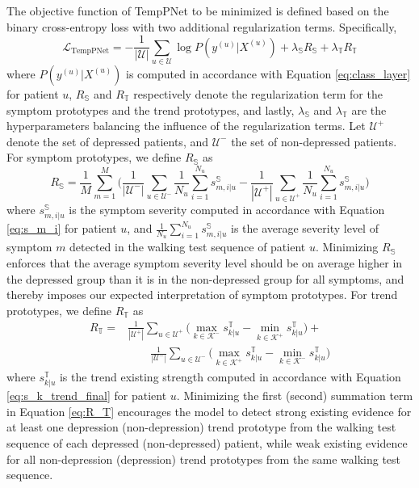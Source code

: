 \documentclass[mnsc]{informs3b} %
\begin{document}
The objective function of TempPNet to be minimized is defined based on the binary cross-entropy loss with two additional regularization terms. Specifically, 
\begin{equation}
  \label{eq:objective}
   \mathcal{L}_{\text{TempPNet}} = - \frac{1}{|\mathcal{U}|} \sum_{u \in \mathcal{U} } \log P(y^{(u)}|X^{(u)}) + \lambda_{\mathbb{S}} R_{\mathbb{S}} + \lambda_{\mathbb{T}} R_{\mathbb{T}}
\end{equation}
where $P(y^{(u)}|X^{(u)})$ is computed in accordance with Equation \ref{eq:class_layer} for patient $u$, $R_{\mathbb{S}}$ and $R_{\mathbb{T}}$ respectively denote the regularization term for the symptom prototypes and the trend prototypes, and lastly, $\lambda_{\mathbb{S}}$ and $\lambda_{\mathbb{T}}$ are the hyperparameters balancing the influence of the regularization terms. 
Let $\mathcal{U}^{+}$ denote the set of depressed patients, and $\mathcal{U}^{-}$ the set of non-depressed patients.
For symptom prototypes, we define $R_{\mathbb{S}}$ as
\begin{equation}
    \label{eq:R_S}
    R_{\mathbb{S}} = \frac{1}{M} \sum_{m=1}^{M} \Big( \frac{1}{|\mathcal{U}^{-}|} \sum_{u \in \mathcal{U}^{-}} 
       \frac{1}{N_u} \sum_{i=1}^{N_u} s_{m,i|u}^{\mathbb{S}}
       - 
       \frac{1}{|\mathcal{U}^{+}|} \sum_{u \in \mathcal{U}^{+}} 
       \frac{1}{N_u} \sum_{i=1}^{N_u} s_{m,i|u}^{\mathbb{S}} \Big)
\end{equation}
where $s_{m,i|u}^{\mathbb{S}}$ is the symptom severity computed in accordance with Equation \ref{eq:s_m_i} for patient $u$, and $\frac{1}{N_u}\sum_{i=1}^{N_u} s_{m,i|u}^{\mathbb{S}}$ is the average severity level of symptom $m$ detected in the walking test sequence of patient $u$. Minimizing $R_{\mathbb{S}}$ enforces that the average symptom severity level should be on average higher in the depressed group than it is in the non-depressed group for all symptoms, and thereby imposes our expected interpretation of symptom prototypes.
For trend prototypes, we define $R_{\mathbb{T}}$ as 
\begin{equation}
\label{eq:R_T}
\begin{aligned}
R_{\mathbb{T}} =& \frac{1}{|\mathcal{U}^{+}|} \sum_{u \in \mathcal{U}^{+}} 
   \big( \max_{k \in \mathcal{K}^{-} } s_{k|u}^{\mathbb{T}}  - \min_{k \in \mathcal{K}^{+} } s_{k|u}^{\mathbb{T}} \big)
   + \\
   & \qquad \frac{1}{|\mathcal{U}^{-}|} \sum_{u \in \mathcal{U}^{-}} 
   \big( \max_{k \in \mathcal{K}^{+} } s_{k|u}^{\mathbb{T}} - \min_{k \in \mathcal{K}^{-} } s_{k|u}^{\mathbb{T}} \big)
\end{aligned}
\end{equation}
where $s_{k|u}^{\mathbb{T}}$ is the trend existing strength computed in accordance with Equation \ref{eq:s_k_trend_final} for patient $u$. Minimizing the first (second) summation term in Equation \ref{eq:R_T} encourages the model to detect strong existing evidence for at least one depression (non-depression) trend prototype from the walking test sequence of each depressed (non-depressed) patient, while weak existing evidence for all non-depression (depression) trend prototypes from the same walking test sequence.
\end{document}
